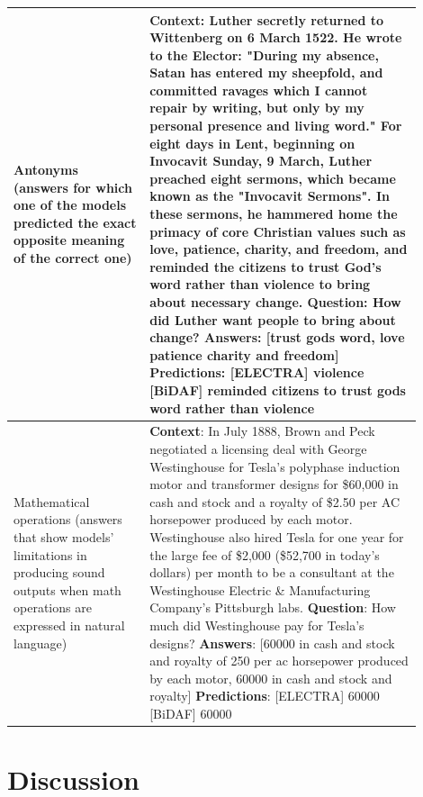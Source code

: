 \documentclass[a4paper,10pt]{report}
\begin{document}
\begin{longtable}{m{0.30\linewidth}|m{0.6\linewidth}}
  Antonyms \newline \small{(answers for which one of the models predicted the exact opposite meaning of the correct one)} & \textbf{Context}: Luther secretly returned to Wittenberg on 6 March 1522. He wrote to the Elector: "During my absence, Satan has entered my sheepfold, and committed ravages which I cannot repair by writing, but only by my personal presence and living word." For eight days in Lent, beginning on Invocavit Sunday, 9 March, Luther preached eight sermons, which became known as the "Invocavit Sermons". In these sermons, he hammered home the primacy of core Christian values such as love, patience, charity, and freedom, and reminded the citizens to trust God's word rather than violence to bring about necessary change. \newline
  \textbf{Question}: How did Luther want people to bring about change? \newline
  \textbf{Answers}: [trust gods word, love patience charity and freedom] \newline
  \textbf{Predictions}: [ELECTRA] violence [BiDAF] reminded citizens to trust gods word rather than violence \\ \hline
  Mathematical operations \newline \small{(answers that show models' limitations in producing sound outputs when math operations are expressed in natural language)} & \textbf{Context}: In July 1888, Brown and Peck negotiated a licensing deal with George Westinghouse for Tesla's polyphase induction motor and transformer designs for \$60,000 in cash and stock and a royalty of \$2.50 per AC horsepower produced by each motor. Westinghouse also hired Tesla for one year for the large fee of \$2,000 (\$52,700 in today's dollars) per month to be a consultant at the Westinghouse Electric \& Manufacturing Company's Pittsburgh labs. \newline
  \textbf{Question}: How much did Westinghouse pay for Tesla's designs? \newline
  \textbf{Answers}: [60000 in cash and stock and royalty of 250 per ac horsepower produced by each motor, 60000 in cash and stock and royalty] \newline
  \textbf{Predictions}: [ELECTRA] 60000 [BiDAF] 60000 
  \label{table:errors}
\end{longtable}

\chapter{Discussion}\label{chap:discussion}
\end{document}
